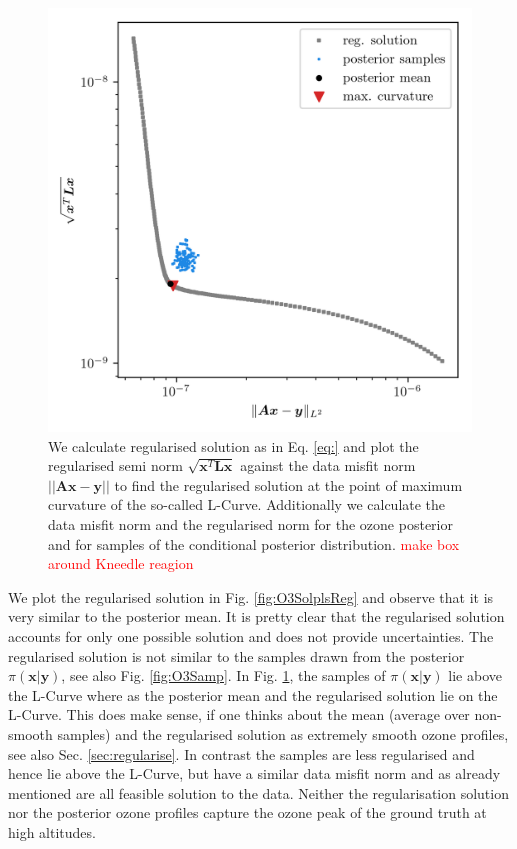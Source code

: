 \begin{figure}[ht!]
	\centering
	\includegraphics{LCurvePhD.png}
	\caption[Plot of the L-curve to find the regularised solution.]{We calculate regularised solution as in Eq. \ref{eq:} and plot the regularised semi norm $\sqrt{\bm{x}^T\bm{Lx}}$ against the data misfit norm $||\bm{Ax} -\bm{y} ||$ to find the regularised solution at the point of maximum curvature of the so-called L-Curve. Additionally we calculate the data misfit norm and the regularised norm for the ozone posterior and for samples of the conditional posterior distribution. \textcolor{red}{make box around Kneedle reagion}}
	\label{fig:LCurve}
\end{figure}

We plot the regularised solution in Fig. \ref{fig:O3SolplsReg} and observe that it is very similar to the posterior mean.
It is pretty clear that the regularised solution accounts for only one possible solution and does not provide uncertainties. The regularised solution is not similar to the samples drawn from the posterior $\pi(\bm{x}| \bm{y})$, see also Fig. \ref{fig:O3Samp}.
In Fig. \ref{fig:LCurve}, the samples of $\pi(\bm{x}| \bm{y})$ lie above the L-Curve where as the posterior mean and the regularised solution lie on the L-Curve.
This does make sense, if one thinks about the mean (average over non-smooth samples) and the regularised solution as extremely smooth ozone profiles, see also Sec. \ref{sec:regularise}.
In contrast the samples are less regularised and hence lie above the L-Curve, but have a similar data misfit norm and as already mentioned are all feasible solution to the data.
Neither the regularisation solution nor the posterior ozone profiles capture the ozone peak of the ground truth at high altitudes.
\clearpage

